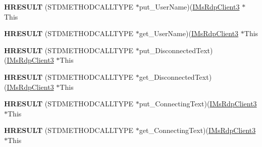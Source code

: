 \begin{DoxyCompactItemize}
\item 
\mbox{\label{struct_m_s_t_s_c_lib_1_1_i_ms_rdp_client3_vtbl_ad78386a76ad99fc07175552b8092a398}} 
{\bfseries H\+R\+E\+S\+U\+LT} (S\+T\+D\+M\+E\+T\+H\+O\+D\+C\+A\+L\+L\+T\+Y\+PE $\ast$put\+\_\+\+User\+Name)(\hyperlink{interface_m_s_t_s_c_lib_1_1_i_ms_rdp_client3}{I\+Ms\+Rdp\+Client3} $\ast$This
\item 
\mbox{\label{struct_m_s_t_s_c_lib_1_1_i_ms_rdp_client3_vtbl_a09f846dfe8eea06594beb6d7d3784730}} 
{\bfseries H\+R\+E\+S\+U\+LT} (S\+T\+D\+M\+E\+T\+H\+O\+D\+C\+A\+L\+L\+T\+Y\+PE $\ast$get\+\_\+\+User\+Name)(\hyperlink{interface_m_s_t_s_c_lib_1_1_i_ms_rdp_client3}{I\+Ms\+Rdp\+Client3} $\ast$This
\item 
\mbox{\label{struct_m_s_t_s_c_lib_1_1_i_ms_rdp_client3_vtbl_a3bf2254a687dab05e1a470aaee550bbd}} 
{\bfseries H\+R\+E\+S\+U\+LT} (S\+T\+D\+M\+E\+T\+H\+O\+D\+C\+A\+L\+L\+T\+Y\+PE $\ast$put\+\_\+\+Disconnected\+Text)(\hyperlink{interface_m_s_t_s_c_lib_1_1_i_ms_rdp_client3}{I\+Ms\+Rdp\+Client3} $\ast$This
\item 
\mbox{\label{struct_m_s_t_s_c_lib_1_1_i_ms_rdp_client3_vtbl_acc099835e8c5aaff2acc0720feded9f3}} 
{\bfseries H\+R\+E\+S\+U\+LT} (S\+T\+D\+M\+E\+T\+H\+O\+D\+C\+A\+L\+L\+T\+Y\+PE $\ast$get\+\_\+\+Disconnected\+Text)(\hyperlink{interface_m_s_t_s_c_lib_1_1_i_ms_rdp_client3}{I\+Ms\+Rdp\+Client3} $\ast$This
\item 
\mbox{\label{struct_m_s_t_s_c_lib_1_1_i_ms_rdp_client3_vtbl_ac65e8e79e970129fc64372a260c96f52}} 
{\bfseries H\+R\+E\+S\+U\+LT} (S\+T\+D\+M\+E\+T\+H\+O\+D\+C\+A\+L\+L\+T\+Y\+PE $\ast$put\+\_\+\+Connecting\+Text)(\hyperlink{interface_m_s_t_s_c_lib_1_1_i_ms_rdp_client3}{I\+Ms\+Rdp\+Client3} $\ast$This
\item 
\mbox{\label{struct_m_s_t_s_c_lib_1_1_i_ms_rdp_client3_vtbl_a81ebe3905f2fd213a4162079103e88e4}} 
{\bfseries H\+R\+E\+S\+U\+LT} (S\+T\+D\+M\+E\+T\+H\+O\+D\+C\+A\+L\+L\+T\+Y\+PE $\ast$get\+\_\+\+Connecting\+Text)(\hyperlink{interface_m_s_t_s_c_lib_1_1_i_ms_rdp_client3}{I\+Ms\+Rdp\+Client3} $\ast$This

\end{DoxyCompactItemize}
